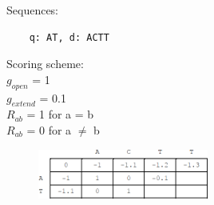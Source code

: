 \begin{multicols}{2}
Sequences:
\begin{verbatim}
    q: AT, d: ACTT
\end{verbatim}
\vfill\null
\columnbreak

\noindent
Scoring scheme: \\
\null \quad $g_{open}$ = 1 \\
\null \quad $g_{extend}$ = 0.1 \\
\null \quad $R_{ab}$ = 1 for a = b \\ 
\null \quad $R_{ab}$ = 0 for a $\neq$ b \\ 

\end{multicols} 

\begin{figure}[H]
  \centering
      \includegraphics[width=0.5\textwidth]{fig03/dp_general_gap_exercise.png}
\end{figure}

%

